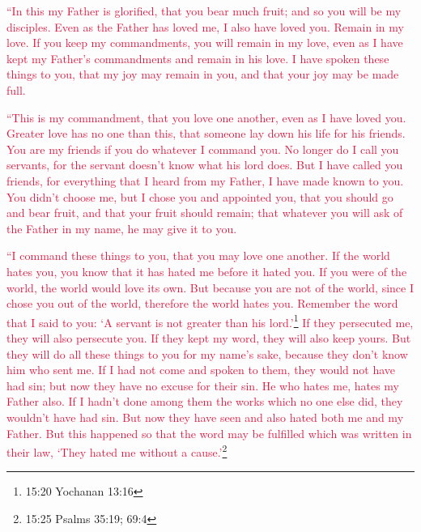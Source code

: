 \myverse{}\textcolor{crimson}{“In this my Father is glorified, that you bear much fruit;
	and so you will be my disciples.
}
\myverse{}\textcolor{crimson}{Even as the Father has loved me, I also have loved you. Remain in my love.
}
\myverse{}\textcolor{crimson}{If you keep my commandments, you will remain in my love, even as I have
	kept my Father’s commandments and remain in his love.
}
\myverse{}\textcolor{crimson}{I have spoken these things to you, that my joy may remain in you, and
	that your joy may be made full.}

\myverse{}\textcolor{crimson}{“This is my commandment, that you love one another, even
	as I have loved you.
}
\myverse{}\textcolor{crimson}{Greater love has no one than this, that someone lay down his life for
	his friends.
}
\myverse{}\textcolor{crimson}{You are my friends if you do whatever I command you.
}
\myverse{}\textcolor{crimson}{No longer do I call you servants, for the servant doesn’t know what his
	lord does. But I have called you friends, for everything that I heard from my Father, I have made known
	to you.
}
\myverse{}\textcolor{crimson}{You didn’t choose me, but I chose you and appointed you, that you should
	go and bear fruit, and that your fruit should remain; that whatever you will ask of the Father in my name,
	he may give it to you.}

\myverse{}\textcolor{crimson}{“I command these things to you, that you may love one another.
}
\myverse{}\textcolor{crimson}{If the world hates you, you know that it has hated me before it hated
	you.
}
\myverse{}\textcolor{crimson}{If you were of the world, the world would love its own. But because you
	are not of the world, since I chose you out of the world, therefore the world hates you.
}
\myverse{}\textcolor{crimson}{Remember the word that I said to you: ‘A servant is not greater than
	his lord.’}\footnote{15:20 Yochanan 13:16}
\textcolor{crimson}{If they persecuted me, they will also persecute you. If they kept my word, they will also keep yours.
}
\myverse{}\textcolor{crimson}{But they will do all these things to you for my name’s sake, because
	they don’t know him who sent me.
}
\myverse{}\textcolor{crimson}{If I had not come and spoken to them, they would not have had sin; but
	now they have no excuse for their sin.
}
\myverse{}\textcolor{crimson}{He who hates me, hates my Father also.
}
\myverse{}\textcolor{crimson}{If I hadn’t done among them the works which no one else did, they wouldn’t
	have had sin. But now they have seen and also hated both me and my Father.
}
\myverse{}\textcolor{crimson}{But this happened so that the word may be fulfilled which was written
	in their law, ‘They hated me without a cause.’}\footnote{15:25 Psalms 35:19;
	69:4}

